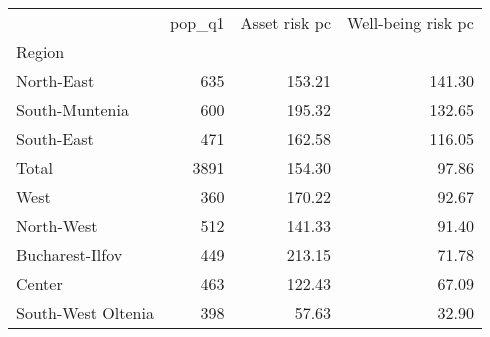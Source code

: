 \begin{tabular}{lrrr}
\toprule
{} &  pop\_q1 &  Asset risk pc &  Well-being risk pc \\
Region             &         &                &                     \\
\midrule
North-East         &     635 &         153.21 &              141.30 \\
South-Muntenia     &     600 &         195.32 &              132.65 \\
South-East         &     471 &         162.58 &              116.05 \\
Total              &    3891 &         154.30 &               97.86 \\
West               &     360 &         170.22 &               92.67 \\
North-West         &     512 &         141.33 &               91.40 \\
Bucharest-Ilfov    &     449 &         213.15 &               71.78 \\
Center             &     463 &         122.43 &               67.09 \\
South-West Oltenia &     398 &          57.63 &               32.90 \\
\bottomrule
\end{tabular}
